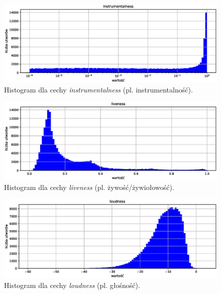 \documentclass[a4paper,12pt]{article}
\numberwithin{figure}{section}
\begin{document}
    \smallskip

    \begin{figure}[H]
        \centering
        \includegraphics[width=\textwidth]{instrumentalness}
        \caption{Histogram dla cechy \textit{instrumentalness} (pl. instrumentalność).}
        \label{fig:instrumentalness}
    \end{figure}

    \smallskip

    \begin{figure}[H]
        \centering
        \includegraphics[width=\textwidth]{liveness}
        \caption{Histogram dla cechy \textit{liveness} (pl. żywość/żywiołowość).}
        \label{fig:liveness}
    \end{figure}

    \smallskip

    \begin{figure}[H]
        \centering
        \includegraphics[width=\textwidth]{loudness}
        \caption{Histogram dla cechy \textit{loudness} (pl. głośność).}
        \label{fig:loudness}
    \end{figure}
\end{document}
